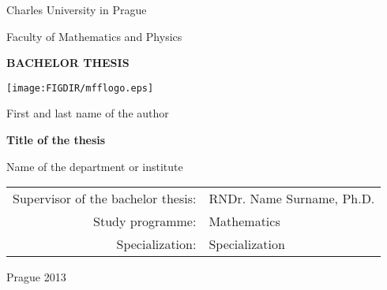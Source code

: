 
\pagestyle{empty}
\begin{center}

{\large Charles University in Prague}

\medskip
{\large Faculty of Mathematics and Physics}

\vfill
{\bfseries\Large BACHELOR THESIS}

\vfill
\centerline{\mbox{\texttt{[image: \\FIGDIR/mfflogo.eps]}}}

\vfill
\vspace{5mm}

{\LARGE First and last name of the author}

\vspace{15mm}

{\LARGE\bfseries Title of the thesis}

\vfill

Name of the department or institute

\vfill

\begin{tabular}{rl}
Supervisor of the bachelor thesis: & RNDr. Name Surname, Ph.D. \\   
\noalign{\vspace{2mm}}
Study programme: & Mathematics\\
\noalign{\vspace{2mm}}
Specialization: & Specialization\\
\end{tabular}

\vfill

Prague 2013

\end{center}



